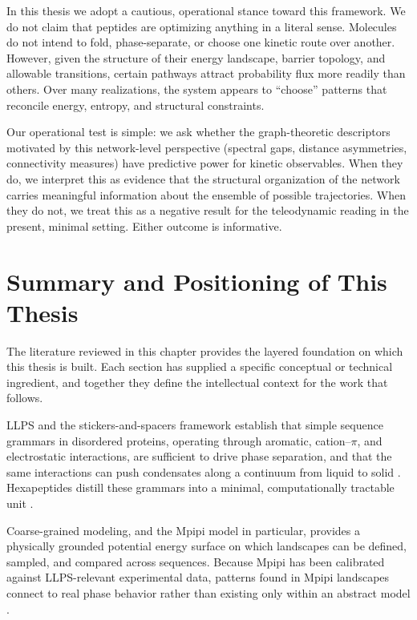 In this thesis we adopt a cautious, operational stance toward this framework. We do not claim that peptides are optimizing anything in a literal sense. Molecules do not intend to fold, phase-separate, or choose one kinetic route over another. However, given the structure of their energy landscape, barrier topology, and allowable transitions, certain pathways attract probability flux more readily than others. Over many realizations, the system appears to ``choose'' patterns that reconcile energy, entropy, and structural constraints.

Our operational test is simple: we ask whether the graph-theoretic descriptors motivated by this network-level perspective (spectral gaps, distance asymmetries, connectivity measures) have predictive power for kinetic observables. When they do, we interpret this as evidence that the structural organization of the network carries meaningful information about the ensemble of possible trajectories. When they do not, we treat this as a negative result for the teleodynamic reading in the present, minimal setting. Either outcome is informative.


\section{Summary and Positioning of This Thesis}

The literature reviewed in this chapter provides the layered foundation on which this thesis is built. Each section has supplied a specific conceptual or technical ingredient, and together they define the intellectual context for the work that follows.

LLPS and the stickers-and-spacers framework establish that simple sequence grammars in disordered proteins, operating through aromatic, cation--$\pi$, and electrostatic interactions, are sufficient to drive phase separation, and that the same interactions can push condensates along a continuum from liquid to solid
\cite{Brangwynne2009,Banani2017Review,Patel2015Nucleation,Alberti2019Aging}.
Hexapeptides distill these grammars into a minimal, computationally tractable unit \cite{Gazit2003,Eisenberg2005Hex}.

Coarse-grained modeling, and the Mpipi model in particular, provides a
physically grounded potential energy surface on which landscapes can be defined,
sampled, and compared across sequences. Because Mpipi has been calibrated
against LLPS-relevant experimental data, patterns found in Mpipi landscapes
connect to real phase behavior rather than existing only within an abstract
model \cite{Joseph2021Mpipi,Nicy2024Mpipi}.

